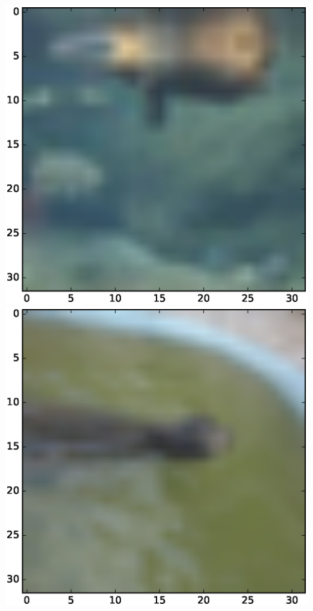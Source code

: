 \documentclass{article}
\begin{document}
\includegraphics[scale=.1]{fig/c5.eps}
\includegraphics[scale=.1]{fig/c6.eps}
\end{document}
